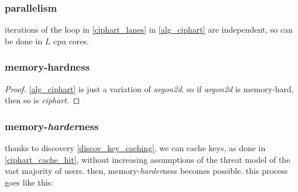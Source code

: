\documentclass[twocolumn]{article}
\begin{document}
\subsubsection{parallelism}
iterations of the loop in \cref{ciphart_lanes} in \cref{alg_ciphart}
are independent, so can be done in $L$ cpu cores.

\subsubsection{memory-hardness}
\begin{proof}
    \cref{alg_ciphart} is just a variation of \emph{argon2d}.  so if
    \emph{argon2d} is memory-hard, then so is \emph{ciphart}.
\end{proof}


\subsubsection{memory-\emph{harder}ness}
thanks to discovery \ref{discov_key_caching}, we can cache keys, as done in
\cref{ciphart_cache_hit}, without increasing assumptions of the threat
model of the vast majority of users.  then, memory-\emph{harder}ness
becomes possible.  this process goes like this:
\end{document}
